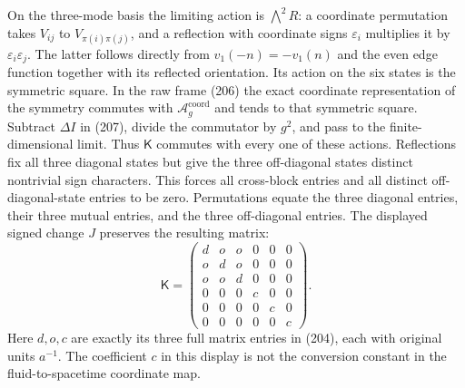 \documentclass[11pt]{article}
\begin{document}
On the three-mode basis the limiting action is $\bigwedge^2R$:
a coordinate permutation takes $V_{ij}$ to $V_{\pi(i)\pi(j)}$,
and a reflection with coordinate signs $\varepsilon_i$ multiplies
it by $\varepsilon_i\varepsilon_j$. The latter follows directly
from $v_1(-n)=-v_1(n)$ and the even edge function together with
its reflected orientation. Its action on the six states is the
symmetric square. In the raw frame (206) the
exact coordinate representation of the symmetry commutes with
$\mathcal A_g^{\mathrm{coord}}$ and tends to that symmetric square.
Subtract $\Delta I$ in (207), divide the
commutator by $g^2$, and pass to the finite-dimensional limit.
Thus $\mathsf K$ commutes with every one of these actions.
Reflections fix all three diagonal states but give the three
off-diagonal states distinct nontrivial sign characters. This
forces all cross-block entries and all distinct off-diagonal-state
entries to be zero. Permutations equate the three diagonal entries,
their three mutual entries, and the three off-diagonal entries.
The displayed signed change $J$ preserves the resulting matrix:
\begin{equation}\label{eq:band-three-channel-K}
 \mathsf K=\begin{pmatrix}
 d&o&o&0&0&0\\o&d&o&0&0&0\\o&o&d&0&0&0\\
 0&0&0&c&0&0\\0&0&0&0&c&0\\0&0&0&0&0&c
 \end{pmatrix}.
\end{equation}
Here $d,o,c$ are exactly its three full matrix entries in
(204), each with original units $a^{-1}$.
The coefficient $c$ in this display is not the conversion constant
in the fluid-to-spacetime coordinate map.
\end{document}
